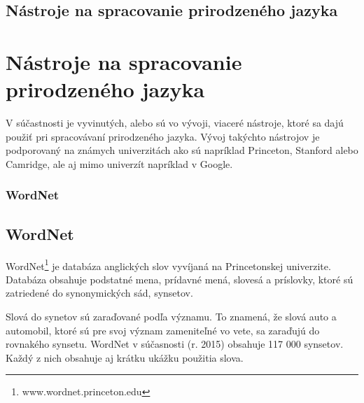 %
%
{
	\subsection{Nástroje na spracovanie prirodzeného jazyka}
}
{
	\section{Nástroje na spracovanie prirodzeného jazyka}
}
\label{subsec:nlp_nastroje}
V súčastnosti je vyvinutých, alebo sú vo vývoji, viaceré nástroje, ktoré sa dajú použiť pri spracovávaní prirodzeného jazyka. Vývoj takýchto nástrojov je podporovaný na známych univerzitách ako sú napríklad Princeton, Stanford alebo Camridge, ale aj mimo univerzít napríklad v Google. 

%
%
{
	\subsubsection{WordNet}
}
{
	\subsection{WordNet}
}
\label{subsubsec:wordnet}
WordNet\footnote{www.wordnet.princeton.edu} je databáza anglických slov vyvíjaná na Princetonskej univerzite. Databáza obsahuje podstatné mena, prídavné mená, slovesá a príslovky, ktoré sú zatriedené do synonymických sád, synsetov.

Slová do synetov sú zaraďované podľa významu. To znamená, že slová auto a automobil, ktoré sú pre svoj význam zameniteľné vo vete, sa zaraďujú do rovnakého synsetu. WordNet v súčasnosti (r. 2015) obsahuje 117 000 synsetov. Každý z nich obsahuje aj krátku ukážku použitia slova.

